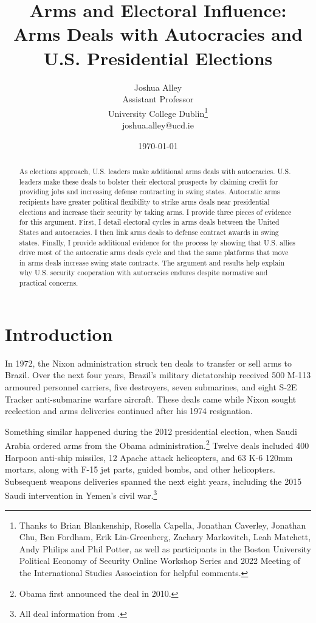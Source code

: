\documentclass[12pt]{article}
\title{\textbf{Arms and Electoral Influence: Arms Deals with Autocracies and U.S. Presidential Elections}}
\author{Joshua Alley \\
Assistant Professor \\
University College Dublin\thanks{Thanks to Brian Blankenship, Rosella Capella, Jonathan Caverley, Jonathan Chu, Ben Fordham, Erik Lin-Greenberg, Zachary Markovitch, Leah Matchett, Andy Philips and Phil Potter, as well as participants in the Boston University Political Economy of Security Online Workshop Series and 2022 Meeting of the International Studies Association for helpful comments.} \\
joshua.alley@ucd.ie
}
\date{\today}
\begin{document}
\maketitle 

\begin{abstract} 
As elections approach, U.S. leaders make additional arms deals with autocracies. 
U.S. leaders make these deals to bolster their electoral prospects by claiming credit for providing jobs and increasing defense contracting in swing states.
Autocratic arms recipients have greater political flexibility to strike arms deals near presidential elections and increase their security by taking arms. 
I provide three pieces of evidence for this argument.  
First, I detail electoral cycles in arms deals between the United States and autocracies. 
I then link arms deals to defense contract awards in swing states.
Finally, I provide additional evidence for the process by showing that U.S. allies drive most of the autocratic arms deals cycle and that the same platforms that move in arms deals increase swing state contracts.  
The argument and results help explain why U.S. security cooperation with autocracies endures despite normative and practical concerns.
\end{abstract} 



\newpage 
\doublespace 


\section{Introduction}



In 1972, the Nixon administration struck ten deals to transfer or sell arms to Brazil.
Over the next four years, Brazil's military dictatorship received 500 M-113 armoured personnel carriers, five destroyers, seven submarines, and eight S-2E Tracker anti-submarine warfare aircraft.
These deals came while Nixon sought reelection and arms deliveries continued after his 1974 resignation. 


Something similar happened during the 2012 presidential election, when Saudi Arabia ordered arms from the Obama administration.\footnote{Obama first announced the deal in 2010.} 
Twelve deals included 400 Harpoon anti-ship missiles, 12 Apache attack helicopters, and 63 K-6 120mm mortars, along with F-15 jet parts, guided bombs, and other helicopters. 
Subsequent weapons deliveries spanned the next eight years, including the 2015 Saudi intervention in Yemen's civil war.\footnote{All deal information from \citep{SIPRI2021}.}
\end{document}
